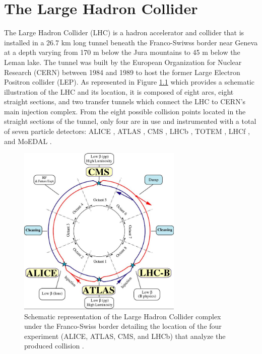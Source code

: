 \chapter{The Large Hadron Collider}
\label{chap:I-2-lhc}

	The Large Hadron Collider (LHC) \cite{Evans:2008zzb} is a hadron accelerator and collider that is installed in a 26.7 km long tunnel beneath the Franco-Swiwss border near Geneva at a depth varying from 170 m below the Jura mountains to 45 m below the Leman lake. The tunnel was built by the European Organization for Nuclear Research (CERN) between 1984 and 1989 to host the former Large Electron Positron collider (LEP). As represented in Figure \ref{fig:I-2-lhc-schematic} which provides a schematic illustration of the LHC and its location, it is composed of eight arcs, eight straight sections, and two transfer tunnels which connect the LHC to CERN's main injection complex. From the eight possible collision points located in the straight sections of the tunnel, only four are in use and instrumented with a total of seven particle detectors: ALICE \cite{1748-0221-3-08-S08002}, ATLAS \cite{1748-0221-3-08-S08003}, CMS \cite{1748-0221-3-08-S08004}, LHCb \cite{1748-0221-3-08-S08005}, TOTEM \cite{1748-0221-3-08-S08007}, LHCf \cite{1748-0221-3-08-S08006}, and MoEDAL \cite{Acharya:2014nyr}. \\

	\begin{figure}[h!]
		\centering
		\includegraphics[width=0.7\textwidth]{img/I-2-lhc/lhc.jpg}
		\caption{Schematic representation of the Large Hadron Collider complex under the Franco-Swiss border detailing the location of the four experiment (ALICE, ATLAS, CMS, and LHCb) that analyze the produced collision \cite{Evans:2008zzb}.}
		\label{fig:I-2-lhc-schematic}
	\end{figure}

